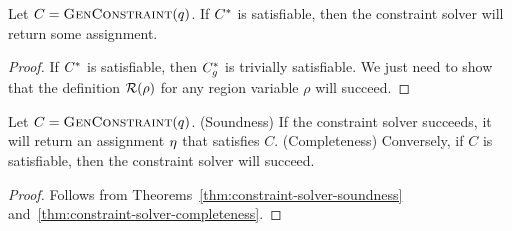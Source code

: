 \begin{theorem}
\label{thm:constraint-solver-completeness}
Let $C = \textsc{GenConstraint}(q)$.
If ${C}^*$ is satisfiable, then the constraint solver will return some assignment.
\end{theorem}

\begin{proof}
If ${C}^*$ is satisfiable, then ${C}^*_g$ is trivially satisfiable.
We just need to show that the definition $\mathcal{R}(\rho)$ for any
region variable $\rho$ will succeed.
\end{proof}

\begin{theorem}
\label{thm:constraint-solver-sc}
Let $C = \textsc{GenConstraint}(q)$.
(Soundness) If the constraint solver succeeds, it will return an assignment $\eta$ 
that satisfies $C$.
(Completeness)
Conversely, if $C$ is satisfiable, then the constraint solver will succeed.
\end{theorem}

\begin{proof}

Follows from Theorems~\ref{thm:constraint-solver-soundness} and~\ref{thm:constraint-solver-completeness}.

% 
% 
% 
% 
% 
\end{proof}

